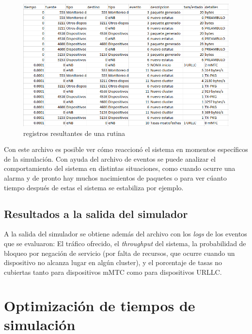 \begin{figure}[th]
    \centering
    \includegraphics[scale=0.8]{Figures/logsdes.png}
    \decoRule
    \caption[Registros resultantes de una rutina]{registros resultantes de una rutina}
    \label{fig:logsdes}
\end{figure}

Con este archivo es posible ver cómo reaccionó el sistema en momentos específicos de la simulación. Con ayuda del archivo de eventos se puede analizar el comportamiento del sistema en distintas situaciones, como cuando ocurre una alarma y de pronto hay muchos nacimientos de paquetes o para ver cúanto tiempo después de estas el sistema se estabiliza por ejemplo. \newline

\subsection{Resultados a la salida del simulador}

A la salida del simulador se obtiene además del archivo con los \textit{logs} de los eventos que se evaluaron: El tráfico ofrecido, el \textit{throughput} del sistema, la probabilidad de bloqueo por negación de servicio (por falta de recursos, que ocurre cuando un dispositivo no alcanza lugar en algún cluster), y el porcentaje de tasas no cubiertas tanto para dispositivos mMTC como para dispositivos URLLC.

\hfill

\break


\section{Optimización de tiempos de simulación}

